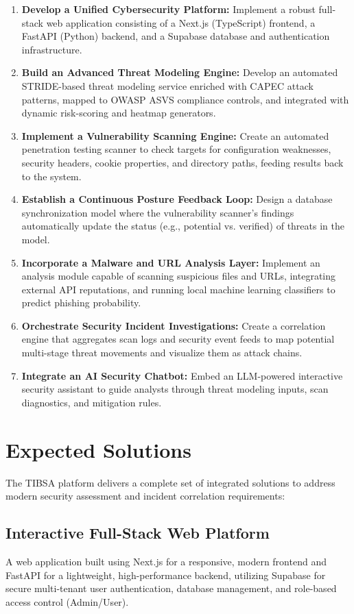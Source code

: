 \begin{enumerate}
    \item \textbf{Develop a Unified Cybersecurity Platform:} Implement a robust full-stack web application consisting of a Next.js (TypeScript) frontend, a FastAPI (Python) backend, and a Supabase database and authentication infrastructure.
    \item \textbf{Build an Advanced Threat Modeling Engine:} Develop an automated STRIDE-based threat modeling service enriched with CAPEC attack patterns, mapped to OWASP ASVS compliance controls, and integrated with dynamic risk-scoring and heatmap generators.
    \item \textbf{Implement a Vulnerability Scanning Engine:} Create an automated penetration testing scanner to check targets for configuration weaknesses, security headers, cookie properties, and directory paths, feeding results back to the system.
    \item \textbf{Establish a Continuous Posture Feedback Loop:} Design a database synchronization model where the vulnerability scanner's findings automatically update the status (e.g., potential vs. verified) of threats in the model.
    \item \textbf{Incorporate a Malware and URL Analysis Layer:} Implement an analysis module capable of scanning suspicious files and URLs, integrating external API reputations, and running local machine learning classifiers to predict phishing probability.
    \item \textbf{Orchestrate Security Incident Investigations:} Create a correlation engine that aggregates scan logs and security event feeds to map potential multi-stage threat movements and visualize them as attack chains.
    \item \textbf{Integrate an AI Security Chatbot:} Embed an LLM-powered interactive security assistant to guide analysts through threat modeling inputs, scan diagnostics, and mitigation rules.
\end{enumerate}

\section{Expected Solutions}

The TIBSA platform delivers a complete set of integrated solutions to address modern security assessment and incident correlation requirements:

\subsection{Interactive Full-Stack Web Platform}
A web application built using Next.js for a responsive, modern frontend and FastAPI for a lightweight, high-performance backend, utilizing Supabase for secure multi-tenant user authentication, database management, and role-based access control (Admin/User).

